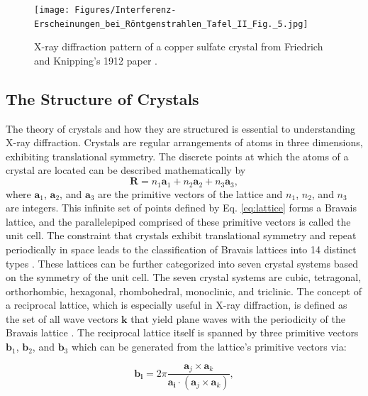 \documentclass[aps,prb,twocolumn,superscriptaddress]{revtex4-2}
\begin{document}
\begin{figure}[h]
    \centering
    \texttt{[image: Figures/Interferenz-Erscheinungen\_bei\_Röntgenstrahlen\_Tafel\_II\_Fig.\_5.jpg]}
    \caption{X-ray diffraction pattern of a copper sulfate crystal from
    Friedrich and Knipping's 1912 paper \cite{vonLaue1912}.} \label{fig:Laue}
\end{figure}

\subsection{The Structure of Crystals}
The theory of crystals and how they are structured is essential to understanding
X-ray diffraction. Crystals are regular arrangements of atoms in three
dimensions, exhibiting translational symmetry. The discrete points at which the
atoms of a crystal are located can be described mathematically by 
\begin{equation}\label{eq:lattice}
    \mathbf{R} = n_1\mathbf{a}_1 + n_2\mathbf{a}_2 + n_3\mathbf{a}_3,   
\end{equation}
where $\mathbf{a}_1$, $\mathbf{a}_2$, and $\mathbf{a}_3$ are the primitive
vectors of the lattice and $n_1$, $n_2$, and $n_3$ are integers. This infinite
set of points defined by Eq. \ref{eq:lattice} forms a Bravais lattice, and the
parallelepiped comprised of these primitive vectors is called the unit cell. The
constraint that crystals exhibit translational symmetry and repeat periodically
in space leads to the classification of Bravais lattices into 14 distinct types
\cite{lattice_types}.  These lattices can be further categorized into seven
crystal systems based on the symmetry of the unit cell. The seven crystal
systems are cubic, tetragonal, orthorhombic, hexagonal, rhombohedral,
monoclinic, and triclinic. The concept of a reciprocal lattice, which is
especially useful in X-ray diffraction, is defined as the set of all wave
vectors $\mathbf{k}$ that yield plane waves with the periodicity of the Bravais
lattice \cite{Ashcroft}.  The reciprocal lattice itself is spanned by three
primitive vectors $\mathbf{b}_1$, $\mathbf{b}_2$, and $\mathbf{b}_3$ which can
be generated from the lattice's primitive vectors via:

\begin{equation}\label{eq:reciprocal}
    \mathbf{b_i} = 2\pi \frac{\mathbf{a}_j \times \mathbf{a}_k}
    {\mathbf{a_i} \cdot (\mathbf{a}_j \times \mathbf{a}_k)},
\end{equation}
\end{document}
